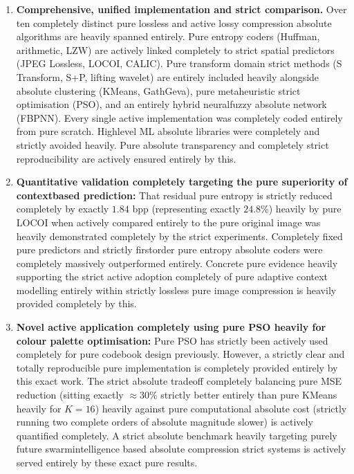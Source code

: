 \begin{enumerate}
    \item \textbf{Comprehensive, unified implementation and strict comparison.} Over ten completely distinct pure lossless and active lossy compression absolute algorithms are heavily spanned entirely. Pure entropy coders (Huffman, arithmetic, LZW) are actively linked completely to strict spatial predictors (JPEG Lossless, LOCOI, CALIC). Pure transform domain strict methods (S Transform, S+P, lifting wavelet) are entirely included heavily alongside absolute clustering (KMeans, GathGeva), pure metaheuristic strict optimisation (PSO), and an entirely hybrid neuralfuzzy absolute network (FBPNN). Every single active implementation was completely coded entirely from pure scratch. Highlevel ML absolute libraries were completely and strictly avoided heavily. Pure absolute transparency and completely strict reproducibility are actively ensured entirely by this.

    \item \textbf{Quantitative validation completely targeting the pure superiority of contextbased prediction:} That residual pure entropy is strictly reduced completely by exactly $1.84$ bpp (representing exactly $24.8\%$) heavily by pure LOCOI when actively compared entirely to the pure original image was heavily demonstrated completely by the strict experiments. Completely fixed pure predictors and strictly firstorder pure entropy absolute coders were completely massively outperformed entirely. Concrete pure evidence heavily supporting the strict active adoption completely of pure adaptive context modelling entirely within strictly lossless pure image compression is heavily provided completely by this.

    \item \textbf{Novel active application completely using pure PSO heavily for colour palette optimisation:} Pure PSO has strictly been actively used completely for pure codebook design previously. However, a strictly clear and totally reproducible pure implementation is completely provided entirely by this exact work. The strict absolute tradeoff completely balancing pure MSE reduction (sitting exactly $\approx 30\%$ strictly better entirely than pure KMeans heavily for $K=16$) heavily against pure computational absolute cost (strictly running two complete orders of absolute magnitude slower) is actively quantified completely. A strict absolute benchmark heavily targeting purely future swarmintelligence based absolute compression strict systems is actively served entirely by these exact pure results.


\end{enumerate}
